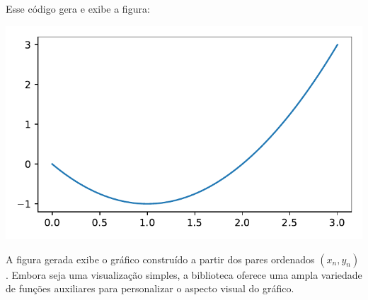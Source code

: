 Esse código gera e exibe a figura:
\begin{center}
    \includegraphics[scale=1.0]{figs/parabola}
\end{center}

A figura gerada exibe o gráfico construído a partir dos pares ordenados $(x_n, y_n)$.
Embora seja uma visualização simples, a biblioteca  oferece uma ampla variedade
de funções auxiliares para personalizar o aspecto visual do gráfico.

